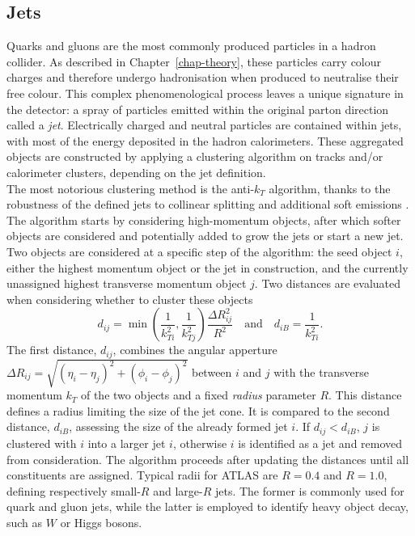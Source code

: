 \subsection{Jets}\label{sec-atlas-jets}
Quarks and gluons are the most commonly produced particles in a hadron collider. As described in Chapter~\ref{chap-theory}, these particles carry colour charges and therefore undergo hadronisation when produced to neutralise their free colour. This complex phenomenological process leaves a unique signature in the detector: a spray of particles emitted within the original parton direction called a \textit{jet}. Electrically charged and neutral particles are contained within jets, with most of the energy deposited in the hadron calorimeters. These aggregated objects are constructed by applying a clustering algorithm on tracks and/or calorimeter clusters, depending on the jet definition. \\ 

The most notorious clustering method is the anti-$k_T$ algorithm, thanks to the robustness of the defined jets to collinear splitting and additional soft emissions \cite{Cacciari:2008gp}. The algorithm starts by considering high-momentum objects, after which softer objects are considered and potentially added to grow the jets or start a new jet. Two objects are considered at a specific step of the algorithm: the seed object $i$, either the highest momentum object or the jet in construction, and the currently unassigned highest transverse momentum object $j$. Two distances are evaluated when considering whether to cluster these objects
\begin{equation}
  d_{ij} = \min\left(\frac{1}{k_{Ti}^2}, \frac{1}{k_{Tj}^2} \right) \frac{\Delta R_{ij}^2}{R^2} \quad \text{and} \quad d_{iB} = \frac{1}{k_{Ti}^2}.
\end{equation}
The first distance, $d_{ij}$, combines the angular apperture $\Delta R_{ij} = \sqrt{(\eta_i - \eta_j)^2 + (\phi_i - \phi_j)^2}$ between $i$ and $j$ with the transverse momentum $k_T$ of the two objects and a fixed \textit{radius} parameter $R$. This distance defines a radius limiting the size of the jet cone. It is compared to the second distance, $d_{iB}$, assessing the size of the already formed jet $i$. If $d_{ij} < d_{iB}$, $j$ is clustered with $i$ into a larger jet $i$, otherwise $i$ is identified as a jet and removed from consideration. The algorithm proceeds after updating the distances until all constituents are assigned. Typical radii for ATLAS are $R = 0.4$ and $R=1.0$, defining respectively small-$R$ and large-$R$ jets. The former is commonly used for quark and gluon jets, while the latter is employed to identify heavy object decay, such as $W$ or Higgs bosons. \\

